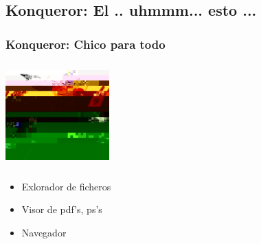 \subsection{Konqueror: El .. uhmmm... esto ... }
\frame
{
	\frametitle{Konqueror: Chico para todo}
	\begin{center}
		\includegraphics[height=4cm,width=4cm]{./imgs/navaja}
	\end{center}

	\begin{itemize}
		\item{Exlorador de ficheros}
		\item{Visor de pdf's, ps's}
		\item{Navegador}
	\end{itemize}
}

